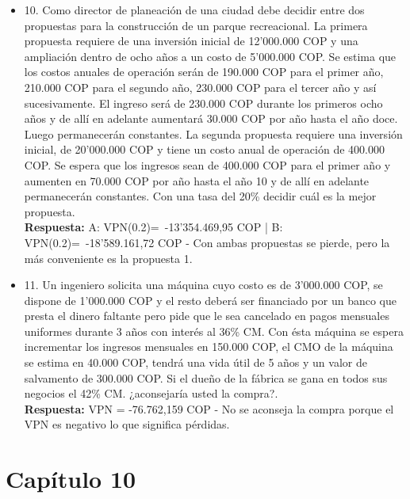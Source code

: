 \begin{itemize}
       \medskip

 \item 10. Como director de planeación de una ciudad debe decidir entre dos propuestas para la construcción de un parque recreacional. La primera propuesta requiere de una inversión inicial de 12'000.000 COP y una ampliación dentro de ocho años a un costo de 5'000.000 COP. Se estima que los costos anuales de operación serán de 190.000 COP para el primer año, 210.000 COP para el segundo año, 230.000 COP para el tercer año y así sucesivamente. El ingreso será de 230.000 COP durante los primeros ocho años y de allí en adelante aumentará 30.000 COP por año hasta el año doce. Luego permanecerán constantes. La segunda propuesta requiere una inversión inicial, de 20'000.000 COP y tiene un costo anual de operación de 400.000 COP. Se espera que los ingresos sean de 400.000 COP para el primer año y aumenten en 70.000 COP por año hasta el año 10 y de allí en adelante permanecerán constantes. Con una tasa del 20\% decidir cuál es la mejor propuesta. \\

       \textbf{Respuesta:} A: VPN(0.2)=\  -13'354.469,95 COP | B: VPN(0.2)=\  -18'589.161,72 COP - Con ambas propuestas se pierde, pero la más conveniente es la propuesta 1.

       \medskip

 \item 11. Un ingeniero solicita una máquina cuyo costo es de 3'000.000 COP, se dispone de 1'000.000 COP y el resto deberá ser financiado por un banco que presta el dinero faltante pero pide que le sea cancelado en pagos mensuales uniformes durante 3 años con  interés al 36\%  CM. Con ésta máquina se espera incrementar los ingresos mensuales en 150.000 COP, el CMO de la máquina se estima en 40.000 COP, tendrá una vida útil de 5 años y un valor de salvamento de 300.000 COP. Si el dueño de la fábrica se gana en todos sus negocios el 42\% CM. ¿aconsejaría usted la compra?. \\

       \textbf{Respuesta:} VPN = -76.762,159 COP - No se aconseja la compra porque el VPN es negativo lo que significa pérdidas.

       \medskip

\end{itemize}


\chapter*{Capítulo 10}

